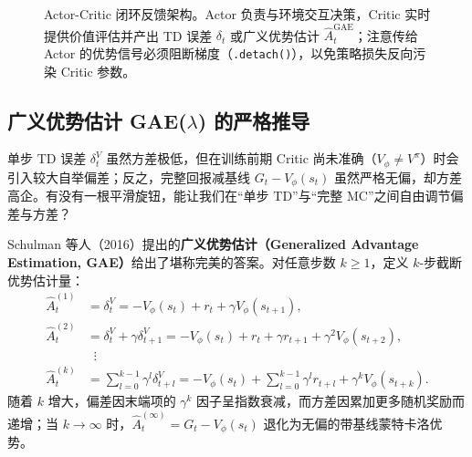 \begin{figure}[htbp]
{}
\caption{Actor-Critic 闭环反馈架构。Actor 负责与环境交互决策，Critic 实时提供价值评估并产出 TD 误差 $\delta_t$ 或广义优势估计 $\hat{A}_t^{\mathrm{GAE}}$；注意传给 Actor 的优势信号必须阻断梯度（\texttt{.detach()}），以免策略损失反向污染 Critic 参数。}
\label{fig:actor-critic}
\end{figure}

\subsection{广义优势估计 GAE($\lambda$) 的严格推导}

单步 TD 误差 $\delta_t^V$ 虽然方差极低，但在训练前期 Critic 尚未准确（$V_\phi \neq V^\pi$）时会引入较大自举偏差；反之，完整回报减基线 $G_t - V_\phi(s_t)$ 虽然严格无偏，却方差高企。有没有一根平滑旋钮，能让我们在“单步 TD”与“完整 MC”之间自由调节偏差与方差？

Schulman 等人（2016）提出的\textbf{广义优势估计（Generalized Advantage Estimation, GAE）}给出了堪称完美的答案。对任意步数 $k \ge 1$，定义 $k$-步截断优势估计量：
\begin{align*}
  \hat{A}_t^{(1)} &= \delta_t^V = -V_\phi(s_t) + r_t + \gamma V_\phi(s_{t+1}), \\
  \hat{A}_t^{(2)} &= \delta_t^V + \gamma \delta_{t+1}^V = -V_\phi(s_t) + r_t + \gamma r_{t+1} + \gamma^2 V_\phi(s_{t+2}), \\
  &\;\;\vdots \\
  \hat{A}_t^{(k)} &= \sum_{l=0}^{k-1} \gamma^l \delta_{t+l}^V = -V_\phi(s_t) + \sum_{l=0}^{k-1} \gamma^l r_{t+l} + \gamma^k V_\phi(s_{t+k}).
\end{align*}
随着 $k$ 增大，偏差因末端项的 $\gamma^k$ 因子呈指数衰减，而方差因累加更多随机奖励而递增；当 $k \to \infty$ 时，$\hat{A}_t^{(\infty)} = G_t - V_\phi(s_t)$ 退化为无偏的带基线蒙特卡洛优势。

